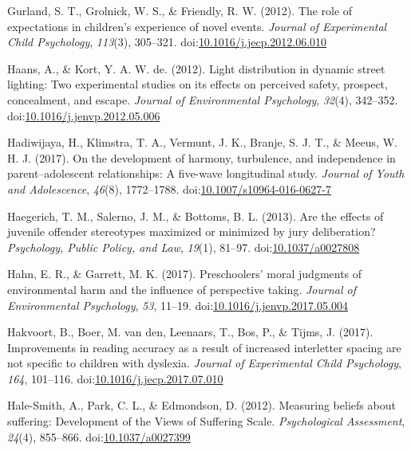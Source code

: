 \documentclass[english,man]{apa6}
\theoremstyle{definition}
\theoremstyle{definition}
\theoremstyle{definition}
\theoremstyle{remark}
\begin{document}
\hypertarget{ref-Gurland2012}{}
Gurland, S. T., Grolnick, W. S., \& Friendly, R. W. (2012). The role of
expectations in children's experience of novel events. \emph{Journal of
Experimental Child Psychology}, \emph{113}(3), 305--321.
doi:\href{https://doi.org/10.1016/j.jecp.2012.06.010}{10.1016/j.jecp.2012.06.010}

\hypertarget{ref-Haans2012}{}
Haans, A., \& Kort, Y. A. W. de. (2012). Light distribution in dynamic
street lighting: Two experimental studies on its effects on perceived
safety, prospect, concealment, and escape. \emph{Journal of
Environmental Psychology}, \emph{32}(4), 342--352.
doi:\href{https://doi.org/10.1016/j.jenvp.2012.05.006}{10.1016/j.jenvp.2012.05.006}

\hypertarget{ref-Hadiwijaya2017}{}
Hadiwijaya, H., Klimstra, T. A., Vermunt, J. K., Branje, S. J. T., \&
Meeus, W. H. J. (2017). On the development of harmony, turbulence, and
independence in parent--adolescent relationships: A five-wave
longitudinal study. \emph{Journal of Youth and Adolescence},
\emph{46}(8), 1772--1788.
doi:\href{https://doi.org/10.1007/s10964-016-0627-7}{10.1007/s10964-016-0627-7}

\hypertarget{ref-Haegerich2013}{}
Haegerich, T. M., Salerno, J. M., \& Bottoms, B. L. (2013). Are the
effects of juvenile offender stereotypes maximized or minimized by jury
deliberation? \emph{Psychology, Public Policy, and Law}, \emph{19}(1),
81--97. doi:\href{https://doi.org/10.1037/a0027808}{10.1037/a0027808}

\hypertarget{ref-Hahn2017}{}
Hahn, E. R., \& Garrett, M. K. (2017). Preschoolers' moral judgments of
environmental harm and the influence of perspective taking.
\emph{Journal of Environmental Psychology}, \emph{53}, 11--19.
doi:\href{https://doi.org/10.1016/j.jenvp.2017.05.004}{10.1016/j.jenvp.2017.05.004}

\hypertarget{ref-Hakvoort2017}{}
Hakvoort, B., Boer, M. van den, Leenaars, T., Bos, P., \& Tijms, J.
(2017). Improvements in reading accuracy as a result of increased
interletter spacing are not specific to children with dyslexia.
\emph{Journal of Experimental Child Psychology}, \emph{164}, 101--116.
doi:\href{https://doi.org/10.1016/j.jecp.2017.07.010}{10.1016/j.jecp.2017.07.010}

\hypertarget{ref-Hale-Smith2012}{}
Hale-Smith, A., Park, C. L., \& Edmondson, D. (2012). Measuring beliefs
about suffering: Development of the Views of Suffering Scale.
\emph{Psychological Assessment}, \emph{24}(4), 855--866.
doi:\href{https://doi.org/10.1037/a0027399}{10.1037/a0027399}
\end{document}
